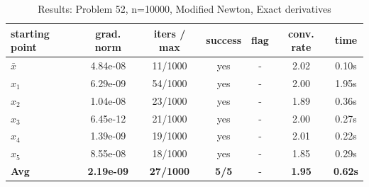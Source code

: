 \begin{longtable}{|l|c|c|c|c|c|c|}
\caption{Results: Problem 52, n=10000, Modified Newton, Exact derivatives} \\
\hline
\textbf{starting point} & \textbf{grad. norm} & \textbf{iters / max} & \textbf{success} & \textbf{flag} & \textbf{conv. rate} & \textbf{time} \\
\hline
\endfirsthead
\endhead
\endfoot
\hline
\endlastfoot
$\bar{x}$ & 4.84e-08 & 11/1000 & yes & - & 2.02 & 0.10s \\
\hline
$x_1$ & 6.29e-09 & 54/1000 & yes & - & 2.00 & 1.95s \\
\hline
$x_2$ & 1.04e-08 & 23/1000 & yes & - & 1.89 & 0.36s \\
\hline
$x_3$ & 6.45e-12 & 21/1000 & yes & - & 2.00 & 0.27s \\
\hline
$x_4$ & 1.39e-09 & 19/1000 & yes & - & 2.01 & 0.22s \\
\hline
$x_5$ & 8.55e-08 & 18/1000 & yes & - & 1.85 & 0.29s \\
\hline
\hline\hline
\textbf{Avg} & \textbf{2.19e-09} & \textbf{27/1000} & \textbf{5/5} & - & \textbf{1.95} & \textbf{0.62s} \\
\hline\hline
\end{longtable}


